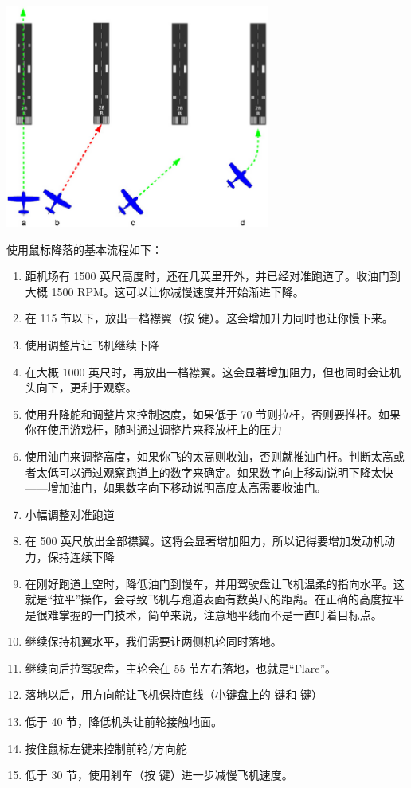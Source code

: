 \begin{itemize}
\centerline{
  \includegraphics[width=0.65\textwidth]{img/basic_tutorial/runway-alignment}
}


使用鼠标降落的基本流程如下：
\begin{enumerate}
  \item  距机场有 1500 英尺高度时，还在几英里开外，并已经对准跑道了。收油门到大概 1500 RPM。这可以让你减慢速度并开始渐进下降。
  \item 在 115 节以下，放出一档襟翼（按 \key{]} 键）。这会增加升力同时也让你慢下来。
  \item 使用调整片让飞机继续下降
  \item 在大概 1000 英尺时，再放出一档襟翼。这会显著增加阻力，但也同时会让机头向下，更利于观察。
  \item 使用升降舵和调整片来控制速度，如果低于 70 节则拉杆，否则要推杆。如果你在使用游戏杆，随时通过调整片来释放杆上的压力
  \item 使用油门来调整高度，如果你飞的太高则收油，否则就推油门杆。判断太高或者太低可以通过观察跑道上的数字来确定。如果数字向上移动说明下降太快——增加油门，如果数字向下移动说明高度太高需要收油门。
  \item 小幅调整对准跑道
  \item 在 500 英尺放出全部襟翼。这将会显著增加阻力，所以记得要增加发动机动力，保持连续下降
  \item 在刚好跑道上空时，降低油门到慢车，并用驾驶盘让飞机温柔的指向水平。这就是“拉平”操作，会导致飞机与跑道表面有数英尺的距离。在正确的高度拉平是很难掌握的一门技术，简单来说，注意地平线而不是一直叮着目标点。
  \item 继续保持机翼水平，我们需要让两侧机轮同时落地。
  \item 继续向后拉驾驶盘，主轮会在 55 节左右落地，也就是“Flare”。
  \item 落地以后，用方向舵让飞机保持直线（小键盘上的  键和  键）
  \item 低于 40 节，降低机头让前轮接触地面。
  \item 按住鼠标左键来控制前轮/方向舵
  \item 低于 30 节，使用刹车（按  键）进一步减慢飞机速度。
\end{enumerate}


\end{itemize}
